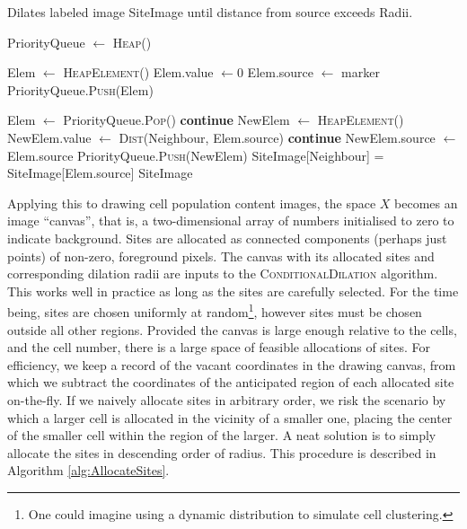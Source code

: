 \begin{algorithm}
\caption{Dilates labeled image SiteImage until distance from source exceeds Radii.} \label{alg:ConditionalDilation}
\begin{algorithmic}[1]

\State PriorityQueue $\leftarrow$ \textsc{Heap}()

    \State Elem $\leftarrow$ \textsc{HeapElement}()
    \State Elem.value $\leftarrow 0$ 
    \State Elem.source $\leftarrow$ marker 
    \State PriorityQueue.\textsc{Push}(Elem)
\EndFor

    \State Elem $\leftarrow$ PriorityQueue.\textsc{Pop}()
            \State \textbf{continue} 
        \EndIf
        \State NewElem $\leftarrow$ \textsc{HeapElement}()
        \State NewElem.value $\leftarrow$ \textsc{Dist}(Neighbour, Elem.source)
            \State \textbf{continue} 
        \EndIf
        \State NewElem.source $\leftarrow$ Elem.source
        \State PriorityQueue.\textsc{Push}(NewElem)
        \State SiteImage[Neighbour] = SiteImage[Elem.source]
    \EndFor
\EndWhile
\State\Return SiteImage
\EndProcedure
\end{algorithmic}
\end{algorithm}

Applying this to drawing cell population content images, the space $X$ becomes an image ``canvas'', that is, a two-dimensional array of numbers initialised to zero to indicate background. Sites are allocated as connected components (perhaps just points) of non-zero, foreground pixels. The canvas with its allocated sites and corresponding dilation radii are inputs to the \textsc{ConditionalDilation} algorithm. This works well in practice as long as the sites are carefully selected. For the time being, sites are chosen uniformly at random\footnote{One could imagine using a dynamic distribution to simulate cell clustering.}, however sites must be chosen outside all other regions. Provided the canvas is large enough relative to the cells, and the cell number, there is a large space of feasible allocations of sites. For efficiency, we keep a record of the vacant coordinates in the drawing canvas, from which we subtract the coordinates of the anticipated region of each allocated site on-the-fly. If we naively allocate sites in arbitrary order, we risk the scenario by which a larger cell is allocated in the vicinity of a smaller one, placing the center of the smaller cell within the region of the larger. A neat solution is to simply allocate the sites in descending order of radius. This procedure is described in Algorithm \ref{alg:AllocateSites}.

